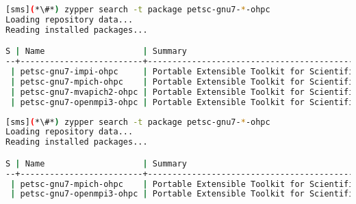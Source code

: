 \begin{lstlisting}[language=bash,keepspaces=true,keywords={}]
[sms](*\#*) zypper search -t package petsc-gnu7-*-ohpc
Loading repository data...
Reading installed packages...

S | Name                    | Summary
--+-------------------------+--------------------------------------------------------+--------
 | petsc-gnu7-impi-ohpc     | Portable Extensible Toolkit for Scientific Computation | package
 | petsc-gnu7-mpich-ohpc    | Portable Extensible Toolkit for Scientific Computation | package
 | petsc-gnu7-mvapich2-ohpc | Portable Extensible Toolkit for Scientific Computation | package
 | petsc-gnu7-openmpi3-ohpc | Portable Extensible Toolkit for Scientific Computation | package
\end{lstlisting}
\fi

\begin{lstlisting}[language=bash,keepspaces=true,keywords={}]
[sms](*\#*) zypper search -t package petsc-gnu7-*-ohpc
Loading repository data...
Reading installed packages...

S | Name                    | Summary
--+-------------------------+--------------------------------------------------------+--------
 | petsc-gnu7-mpich-ohpc    | Portable Extensible Toolkit for Scientific Computation | package
 | petsc-gnu7-openmpi3-ohpc | Portable Extensible Toolkit for Scientific Computation | package
\end{lstlisting}
\fi


